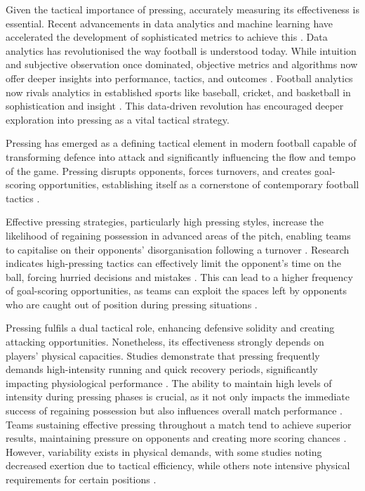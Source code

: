 Given the tactical importance of pressing, accurately measuring its effectiveness is essential. Recent advancements in data analytics and machine learning have accelerated the development of sophisticated metrics to achieve this \citep{link_data_2018, memmert_data_2018, rein_big_2016, rico-gonzalez_markel_machine_2023}. Data analytics has revolutionised the way football is understood today. While intuition and subjective observation once dominated, objective metrics and algorithms now offer deeper insights into performance, tactics, and outcomes \citep{memmert_data_2018}. Football analytics now rivals analytics in established sports like baseball, cricket, and basketball in sophistication and insight \citep{herold_machine_2019, rico-gonzalez_markel_machine_2023}. This data-driven revolution has encouraged deeper exploration into pressing as a vital tactical strategy.

Pressing has emerged as a defining tactical element in modern football capable of transforming defence into attack and significantly influencing the flow and tempo of the game. Pressing disrupts opponents, forces turnovers, and creates goal-scoring opportunities, establishing itself as a cornerstone of contemporary football tactics \citep{robberechts_valuing_2019}.

Effective pressing strategies, particularly high pressing styles, increase the likelihood of regaining possession in advanced areas of the pitch, enabling teams to capitalise on their opponents' disorganisation following a turnover \citep{brindescu_study_2021, fernandez-navarro_evaluating_2019, modric_influence_2023}. Research indicates high-pressing tactics can effectively limit the opponent's time on the ball, forcing hurried decisions and mistakes \citep{forcher_is_2023, low_porous_2021}. This can lead to a higher frequency of goal-scoring opportunities, as teams can exploit the spaces left by opponents who are caught out of position during pressing situations \citep{cooper_impact_2020, fernandes_how_2020}.

Pressing fulfils a dual tactical role, enhancing defensive solidity and creating attacking opportunities. Nonetheless, its effectiveness strongly depends on players' physical capacities. Studies demonstrate that pressing frequently demands high-intensity running and quick recovery periods, significantly impacting physiological performance \citep{bortnik_mean_2022, ju_contextualised_2023}. The ability to maintain high levels of intensity during pressing phases is crucial, as it not only impacts the immediate success of regaining possession but also influences overall match performance \citep{carr_differences_2020, fernandez-navarro_evaluating_2019}. Teams sustaining effective pressing throughout a match tend to achieve superior results, maintaining pressure on opponents and creating more scoring chances \citep{liu_characterization_2024, modric_influence_2023}. However, variability exists in physical demands, with some studies noting decreased exertion due to tactical efficiency, while others note intensive physical requirements for certain positions \citep{low_exploring_2018, carr_differences_2020}.

